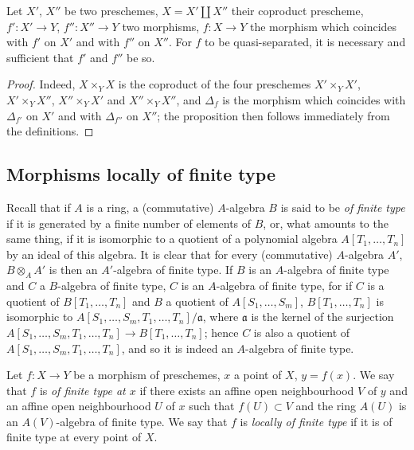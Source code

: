 \begin{proposition}[1.2.9]
\label{IV.1.2.9}
Let $X'$, $X''$ be two preschemes, $X=X'\coprod X''$ their coproduct prescheme,
$f':X'\to Y$, $f'':X''\to Y$ two morphisms, $f:X\to Y$ the morphism which coincides with $f'$ on $X'$
and with $f''$ on $X''$. For $f$ to be quasi-separated, it is necessary and sufficient that $f'$ and $f''$ be so.
\end{proposition}

\begin{proof}
Indeed, $X\times_Y X$ is the coproduct of the four preschemes $X'\times_Y X'$, $X'\times_Y X''$, $X''\times_Y X'$
and $X''\times_Y X''$, and $\Delta_f$ is the morphism which coincides with $\Delta_{f'}$ on $X'$ and with $\Delta_{f''}$ on $X''$;
the proposition then follows immediately from the definitions.
\end{proof}

\subsection{Morphisms locally of finite type}
\label{subsection:IV.1.3}

\begin{env}[1.3.1]
\label{IV.1.3.1}
Recall that if $A$ is a ring, a (commutative) $A$-algebra $B$ is
said to be \emph{of finite type} if it is generated by a finite number of elements of $B$, or, what amounts to
the same thing, if it is isomorphic to a quotient of a polynomial algebra $A[T_1,\ldots,T_n]$
by an ideal of this algebra. It is clear that for every (commutative) $A$-algebra $A'$,
$B\otimes_A A'$ is then an $A'$-algebra of finite type. If $B$ is an $A$-algebra of finite type and $C$
a $B$-algebra of finite type, $C$ is an $A$-algebra of finite type, for if $C$ is a quotient
of $B[T_1,\ldots,T_n]$ and $B$ a quotient of $A[S_1,\ldots,S_m]$, $B[T_1,\ldots,T_n]$ is isomorphic to $A[S_1,\ldots,S_m,T_1,\ldots,T_n]/\mathfrak{a}$,
where $\mathfrak{a}$ is the kernel of the surjection $A[S_1,\ldots,S_m,T_1,\ldots,T_n]\to B[T_1,\ldots,T_n]$; hence $C$ is also a quotient of
$A[S_1,\ldots,S_m,T_1,\ldots,T_n]$, and so it is indeed an $A$-algebra of finite type.
\end{env}

\begin{definition}[1.3.2]
\label{IV.1.3.2}
Let $f:X\to Y$ be a morphism of preschemes, $x$ a point of $X$,
$y=f(x)$. We say that $f$ is \emph{of finite type at $x$} if there exists an affine open neighbourhood $V$ of $y$ and an affine open
neighbourhood $U$ of $x$ such that $f(U)\subset V$ and the ring $A(U)$ is an $A(V)$-algebra of finite type.
We say that $f$ is \emph{locally of finite type} if it is of finite type at every point of $X$.
\end{definition}

